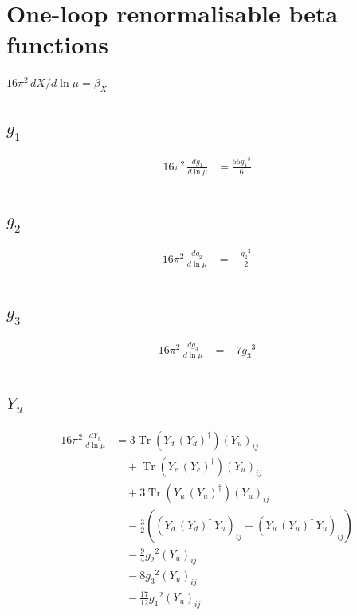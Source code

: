\documentclass[10pt,a4paper]{article}
\begin{document}
\section*{One-loop renormalisable beta functions}
$16\pi^2\,dX/d\ln\mu=\beta_X$
\subsection*{$g_1$}
\begin{align*}
16\pi^2\,\frac{d g_1}{d\ln\mu} &=\frac{55 {g_1}^3}{6} \\
\end{align*}
\subsection*{$g_2$}
\begin{align*}
16\pi^2\,\frac{d g_2}{d\ln\mu} &=-\frac{{g_2}^3}{2} \\
\end{align*}
\subsection*{$g_3$}
\begin{align*}
16\pi^2\,\frac{d g_3}{d\ln\mu} &=-7 {g_3}^3 \\
\end{align*}
\subsection*{$Y_u$}
\begin{align*}
16\pi^2\,\frac{d Y_u}{d\ln\mu} &=3 \operatorname{Tr}\!\left({Y_d}\,\left({Y_d}\right)^{\dagger}\right) \left({Y_u}\right)_{ij} \\
&\quad +\operatorname{Tr}\!\left({Y_e}\,\left({Y_e}\right)^{\dagger}\right) \left({Y_u}\right)_{ij} \\
&\quad +3 \operatorname{Tr}\!\left({Y_u}\,\left({Y_u}\right)^{\dagger}\right) \left({Y_u}\right)_{ij} \\
&\quad -\frac{3}{2} (\left({Y_d}\,\left({Y_d}\right)^{\dagger}\,{Y_u}\right)_{ij}-\left({Y_u}\,\left({Y_u}\right)^{\dagger}\,{Y_u}\right)_{ij}) \\
&\quad -\frac{9}{4} {g_2}^2 \left({Y_u}\right)_{ij} \\
&\quad -8 {g_3}^2 \left({Y_u}\right)_{ij} \\
&\quad -\frac{17}{12} {g_1}^2 \left({Y_u}\right)_{ij} \\
\end{align*}
\end{document}
